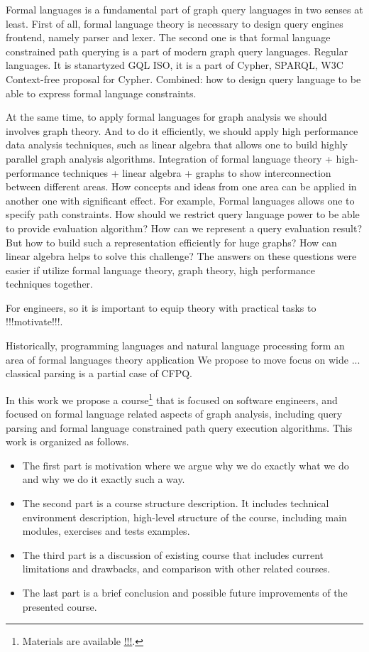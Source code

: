 \documentclass[sigconf]{acmart}
\begin{document}
Formal languages is a fundamental part of graph query languages in two senses at least.
First of all, formal language theory is necessary to design query engines frontend, namely parser and lexer.
The second one is that formal language constrained path querying is a part of modern graph query languages. 
Regular languages. It is stanartyzed GQL ISO, it is a part of Cypher, SPARQL, W3C 
Context-free proposal for Cypher.
Combined: how to design query language to be able to express formal language constraints.

At the same time, to apply formal languages for graph analysis we should involves graph theory.
And to do it efficiently, we should apply high performance data analysis techniques, such as linear algebra that allows one to build highly parallel graph analysis algorithms.
Integration of formal language theory + high-performance techniques + linear algebra + graphs to show interconnection between different areas.
How concepts and ideas from one area can be applied in another one with significant effect. 
For example, Formal languages allows one to specify path constraints.
How should we restrict query language power to be able to provide evaluation algorithm?
How can we represent a query evaluation result?
But how to build such a representation efficiently for huge graphs?
How can linear algebra helps to solve this challenge?
The answers on these questions were easier if utilize formal language theory, graph theory, high performance techniques together.

For engineers, so it is important to equip theory with practical tasks to !!!motivate!!!. 

Historically, programming languages and natural language processing form an area of formal languages theory application
We propose to move focus on wide ... classical parsing is a partial case of CFPQ. 

In this work we propose a course\footnote{Materials are available \url{!!!}.} that is focused on software engineers, and focused on formal language related aspects of graph analysis, including query parsing and formal language constrained path query execution algorithms.
This work is organized as follows.
\begin{itemize}
  \item The first part is motivation where we argue why we do exactly what we do and why we do it exactly such a way. 
  \item The second part is a course structure description. It includes technical environment description, high-level structure of the course, including main modules, exercises and tests examples.
  \item The third part is a discussion of existing course that includes current limitations and drawbacks, and comparison with other related courses.
  \item The last part is a brief conclusion and possible future improvements of the presented course.
\end{itemize}  
\end{document}
